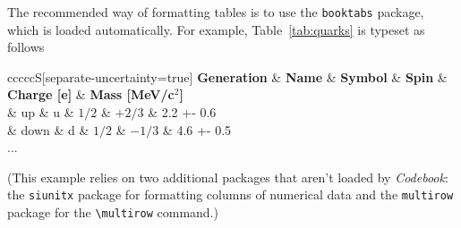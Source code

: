 \documentclass[minted]{codebook}
\begin{document}
The recommended way of formatting tables is to use the \texttt{booktabs} package, which is loaded automatically.
For example, Table~\ref{tab:quarks} is typeset as follows
\begin{texcode}
\begin{table}
  \centering\small
  \caption{Quarks}
  \label{tab:quarks}
  \begin{tabular}{cccccS[separate-uncertainty=true]}
  \toprule
    \textbf{Generation} & \textbf{Name} & \textbf{Symbol} 
    & \textbf{Spin} & \textbf{Charge [e]} & \textbf{Mass [MeV/c$^2$]}\\
  \midrule
      & up      & u & $1/2$ & $+2/3$ & 2.2 +- 0.6\\
       & down    & d & $1/2$ & $-1/3$ & 4.6 +- 0.5\\
  \midrule
    ...
  \bottomrule
  \end{tabular}
\end{table}
\end{texcode}
(This example relies on two additional packages that aren't loaded by \emph{Codebook}: the \texttt{siunitx} package for formatting columns of numerical data and the \texttt{multirow} package for the \verb|\multirow| command.)

\appendix


\backmatter
\printbibliography[heading=bibintoc]

\printindex
\end{document}
